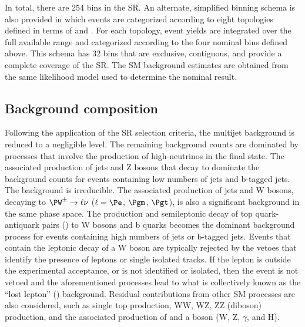 In total, there are 254 bins in the SR. An alternate, simplified
binning schema is also provided in which events are categorized
according to eight topologies defined in terms of \njet and \nb. For
each topology, event yields are integrated over the full available
\scalht range and categorized according to the four nominal \mht bins
defined above. This schema has 32 bins that are exclusive, contiguous,
and provide a complete coverage of the SR. The SM background estimates
are obtained from the same likelihood model used to determine the
nominal result. 


\subsection{Background composition}
\label{sec:bkgd}

Following the application of the SR selection criteria, 
the multijet background is reduced to a negligible level. 
The remaining background counts are dominated by processes that
involve the production of high-\pt neutrinos in the final state. The
associated production of jets and Z bosons that decay to \znunu
dominate the background counts for events containing low numbers of
jets and b-tagged jets. The \znunuj background is irreducible.
The associated production of jets and W bosons, decaying to $\PW^\pm
\to \ell\nu$ ($\ell=\Pe$, $\Pgm$, $\Pgt$), is also a significant
background in the same phase space. The production and semileptonic
decay of top quark-antiquark pairs (\ttbar) to W bosons and b quarks
becomes the dominant background process for events containing high
numbers of jets or b-tagged jets. 
%
Events that contain the leptonic decay of a W boson are typically
rejected by the vetoes that identify the presence of leptons or single
isolated tracks. If the lepton is outside the experimental acceptance,
or is not identified or isolated, then the event is not vetoed and the
aforementioned processes lead to what is collectively known as the
``lost lepton'' (\lost) background.
%
Residual contributions from other SM processes are also considered,
such as single top production, WW, WZ, ZZ (diboson) production, and
the associated production of \ttbar and a boson ({\ttbar}W, {\ttbar}Z,
{\ttbar}$\gamma$, and {\ttbar}H).

